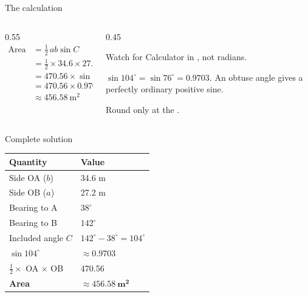 \documentclass[11pt]{beamer}
\begin{document}
\begin{frame}{The calculation}
  \begin{columns}[T]
    \begin{column}{0.55\textwidth}
      \begin{align*}
        \text{Area} &= \tfrac12\,ab\sin C\\[3pt]
                    &= \tfrac12 \times 34.6 \times 27.2 \times \sin 104^\circ\\[3pt]
                    &= 470.56 \times \sin 104^\circ\\[3pt]
                    &= 470.56 \times 0.9703\\[3pt]
                    &\approx 456.58\ \text{m}^2
      \end{align*}
    \end{column}
    \begin{column}{0.45\textwidth}
      \begin{block}{Watch for}
        \small
        Calculator in , not radians.
        \medskip

        $\sin 104^\circ = \sin 76^\circ = 0.9703$. An obtuse angle gives a
        perfectly ordinary positive sine.
        \medskip

        Round only at the .
      \end{block}
    \end{column}
  \end{columns}
\end{frame}

\begin{frame}{Complete solution}
  \begin{center}
    \small
    \begin{tabular}{@{}ll@{}}
      \toprule
      \textbf{Quantity} & \textbf{Value}\\
      \midrule
      Side OA ($b$)               & 34.6 m\\
      Side OB ($a$)               & 27.2 m\\
      Bearing to A                & $38^\circ$\\
      Bearing to B                & $142^\circ$\\
      Included angle $C$          & $142^\circ - 38^\circ = 104^\circ$\\
      $\sin 104^\circ$            & $\approx 0.9703$\\
      $\tfrac12 \times$ OA $\times$ OB & 470.56\\
      \midrule
      \textbf{Area}               & $\mathbf{\approx 456.58\ \text{m}^2}$\\
      \bottomrule
    \end{tabular}
  \end{center}
\end{frame}
\end{document}
